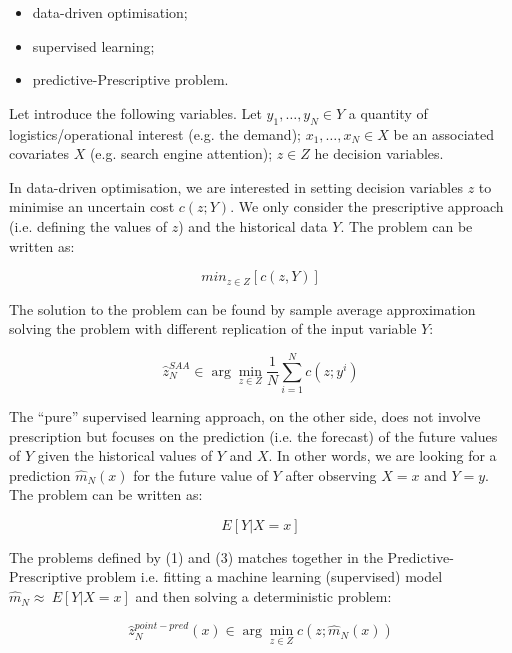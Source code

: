\begin{itemize}
    \item data-driven optimisation;
    \item supervised learning;
    \item predictive-Prescriptive problem.

\end{itemize}

Let introduce the following variables. Let $y_1,\ldots,y_N\in Y$ a quantity of logistics/operational interest (e.g. the demand); $x_1,\ldots,x_N\in X$ be an associated covariates $X$ (e.g. search engine attention); $z\in Z$ he decision variables.

In data-driven optimisation, we are interested in setting decision variables $z$ to minimise an uncertain cost $c(z;Y)$. We only consider the prescriptive approach (i.e. defining the values of $z$) and the historical data $Y$. The problem can be written as:

\begin{equation}
    min_{z \in Z} \left[ c(z,Y) \right]
\end{equation}

The solution to the problem can be found by sample average approximation solving the problem with different replication of the input variable $Y$:

\begin{equation}
    {\hat{z}}_N^{SAA}\in\arg{\min_{z\in Z}{\frac{1}{N}\sum_{i=1}^{N}{c(z;y^i)}}}
\end{equation}

The “pure” supervised learning approach, on the other side, does not involve prescription but focuses on the prediction (i.e. the forecast) of the future values of $Y$ given the historical values of $Y$ and $X$. In other words, we are looking for a prediction ${\hat{m}}_N(x)$ for the future value of $Y$ after observing $X=x$ and $Y=y$. The problem can be written as:

\begin{equation}
    E \left[ Y|X=x \right]
\end{equation}

The problems defined by (1) and (3) matches together in the Predictive-Prescriptive problem i.e. fitting a machine learning (supervised) model ${\hat{m}}_N\approx\ E[Y|X=x]$ and then solving a deterministic problem:

\begin{equation}
    {\hat{z}}_N^{point-pred}\left(x\right)\in\arg{\min_{z\in Z}{c(z;{\hat{m}}_N(x))}}
\end{equation}

